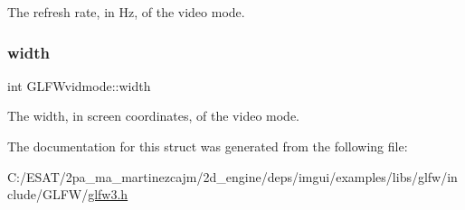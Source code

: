 The refresh rate, in Hz, of the video mode. \mbox{\label{struct_g_l_f_wvidmode_a698dcb200562051a7249cb6ae154c71d}} 
\subsubsection{\texorpdfstring{width}{width}}
{\footnotesize\ttfamily int G\+L\+F\+Wvidmode\+::width}

The width, in screen coordinates, of the video mode. 

The documentation for this struct was generated from the following file\+:\begin{DoxyCompactItemize}
\item 
C\+:/\+E\+S\+A\+T/2pa\+\_\+ma\+\_\+martinezcajm/2d\+\_\+engine/deps/imgui/examples/libs/glfw/include/\+G\+L\+F\+W/\hyperlink{glfw3_8h}{glfw3.\+h}\end{DoxyCompactItemize}
